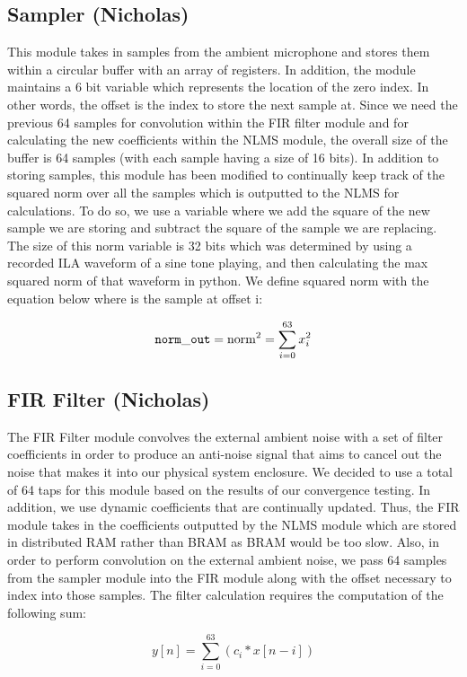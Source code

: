 \documentclass{fpgairpods}
\begin{document}
\subsection{Sampler (Nicholas)}
This module takes in samples from the ambient microphone and stores them within a circular buffer with an array of registers. In addition, the module maintains a 6 bit  variable which represents the location of the zero index. In other words, the offset is the index to store the next sample at. Since we need the previous 64 samples for convolution within the FIR filter module and for calculating the new coefficients within the NLMS module, the overall size of the buffer is 64 samples (with each sample having a size of 16 bits). In addition to storing samples, this module has been modified to continually keep track of the squared norm over all the samples which is outputted to the NLMS for calculations. To do so, we use a  variable where we add the square of the new sample we are storing and subtract the square of the sample we are replacing. The size of this norm variable is 32 bits which was determined by using a recorded ILA waveform of a sine tone playing, and then calculating the max squared norm of that waveform in python. We define squared norm with the equation below where  is the sample at offset i:

$$\ttt{norm_out} = \text{norm}^2 = \sum_{i=0}^{63} x_i^2  $$


\subsection{FIR Filter (Nicholas)}
The FIR Filter module convolves the external ambient noise with a set of filter coefficients in order to produce an anti-noise signal that aims to cancel out the noise that makes it into our physical system enclosure. We decided to use a total of 64 taps for this module based on the results of our convergence testing. In addition, we use dynamic coefficients that are continually updated. Thus, the FIR module takes in the coefficients outputted by the NLMS module which are stored in distributed RAM rather than BRAM as BRAM would be too slow. Also, in order to perform convolution on the external ambient noise, we pass 64 samples from the sampler module into the FIR module along with the offset necessary to index into those samples. The filter calculation requires the computation of the following sum:

$$ y[n] = \sum_{i=0}^{63} (c_i * x[n-i]) $$
\end{document}
